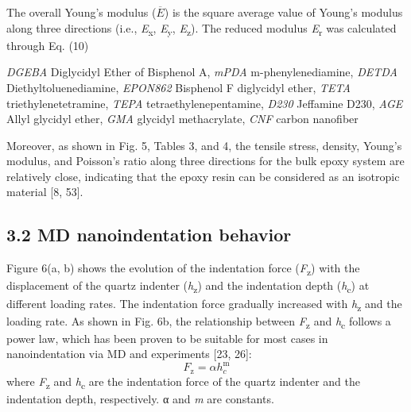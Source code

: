 \documentclass{article}
\begin{document}
{\footnotesize\noindent The overall Young’s modulus ($\overline{E}$) is the square average value of Young’s modulus along three directions (i.e., \emph{E}\textsubscript{x}, \emph{E}\textsubscript{y}, \emph{E}\textsubscript{z}). The reduced modulus \emph{E}\textsubscript{r} was calculated through Eq. (10)

\noindent \emph{DGEBA} Diglycidyl Ether of Bisphenol A, \emph{mPDA} m-phenylenediamine, \emph{DETDA} Diethyltoluenediamine, \emph{EPON862} Bisphenol F diglycidyl ether, \emph{TETA} triethylenetetramine, \emph{TEPA} tetraethylenepentamine, \emph{D230} Jeffamine D230, \emph{AGE} Allyl glycidyl ether, \emph{GMA} glycidyl methacrylate, \emph{CNF} carbon nanofiber\par}

Moreover, as shown in Fig. 5, Tables 3, and 4, the tensile stress, density, Young’s modulus, and Poisson’s ratio along three directions for the bulk epoxy system are relatively close, indicating that the epoxy resin can be considered as an isotropic material [8, 53].

\subsection*{3.2 MD nanoindentation behavior}

Figure 6(a, b) shows the evolution of the indentation force (\emph{F}\textsubscript{z}) with the displacement of the quartz indenter (\emph{h}\textsubscript{z}) and the indentation depth (\emph{h}\textsubscript{c}) at different loading rates. The indentation force gradually increased with \emph{h}\textsubscript{z} and the loading rate. As shown in Fig. 6b, the relationship between \emph{F}\textsubscript{z} and \emph{h}\textsubscript{c} follows a power law, which has been proven to be suitable for most cases in nanoindentation via MD and experiments [23, 26]:
\begin{equation}
F_{\mathrm{z}}=\alpha h_c^{\mathrm{m}}\tag{15}
\end{equation}
where \emph{F}\textsubscript{z} and \emph{h}\textsubscript{c} are the indentation force of the quartz indenter and the indentation depth, respectively. α and \emph{m} are constants.
\end{document}
